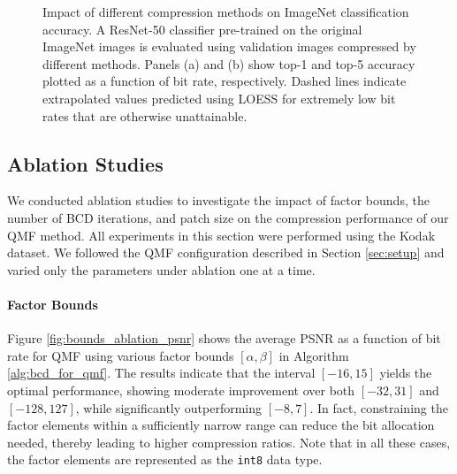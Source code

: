 \begin{figure*}[!t]
    \centering
    \begin{subfigure}[t]{.5\textwidth}
        \centering
        \resizebox{.9\textwidth}{!}{}
        \caption{}
        \label{fig:imagenet_top1}
    \end{subfigure}%
    \begin{subfigure}[t]{.5\textwidth}
        \centering
        \resizebox{.9\textwidth}{!}{}
        \caption{}
        \label{fig:imagenet_top5}
    \end{subfigure}
    \caption{Impact of different compression methods on ImageNet classification accuracy. A ResNet-50 classifier pre-trained on the original ImageNet images is evaluated using validation images compressed by different methods. Panels (a) and (b) show top-1 and top-5 accuracy plotted as a function of bit rate, respectively. Dashed lines indicate extrapolated values predicted using LOESS \cite{cleveland1988locally} for extremely low bit rates that are otherwise unattainable.}
    \label{fig:imagenet_classification}
\end{figure*}


\subsection{Ablation Studies} \label{sec:ablation_studies}

We conducted ablation studies to investigate the impact of factor bounds, the number of BCD iterations, and patch size on the compression performance of our QMF method. All experiments in this section were performed using the Kodak dataset. We followed the QMF configuration described in Section \ref{sec:setup} and varied only the parameters under ablation one at a time.

\paragraph{Factor Bounds}
Figure \ref{fig:bounds_ablation_psnr} shows the average PSNR as a function of bit rate for QMF using various factor bounds $[\alpha, \beta]$ in Algorithm \ref{alg:bcd_for_qmf}. The results indicate that the interval $[-16, 15]$ yields the optimal performance, showing moderate improvement over both $[-32, 31]$ and $[-128, 127]$, while significantly outperforming $[-8, 7]$. In fact, constraining the factor elements within a sufficiently narrow range can reduce the bit allocation needed, thereby leading to higher compression ratios. Note that in all these cases, the factor elements are represented as the \texttt{int8} data type.

